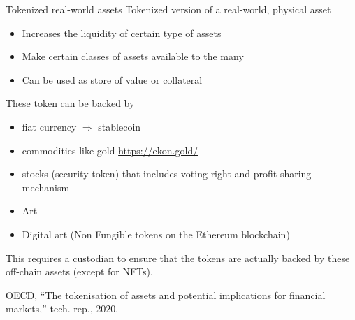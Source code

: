 \documentclass{beamer}
\begin{document}
\begin{frame}{Tokenized real-world assets}
\scriptsize
Tokenized version of a real-world, physical asset
\begin{itemize}
  \item Increases the liquidity of certain type of assets
  \item Make certain classes of assets available to the many
  \item Can be used as store of value or collateral
\end{itemize}
These token can be backed by 
\begin{itemize}
  \item fiat currency $\Rightarrow$ stablecoin
  \item commodities like gold \url{https://ekon.gold/}
  \item stocks (security token) that includes voting right and profit sharing mechanism
  \item Art
  \item Digital art (Non Fungible tokens on the Ethereum blockchain)
\end{itemize}
\begin{tcolorbox}[enhanced,drop shadow, title=Central authority]
    This requires a custodian to ensure that the tokens are actually backed by these off-chain assets (except for NFTs).
\end{tcolorbox}

\scriptsize
\begin{thebibliography}{1}

OECD, ``The tokenisation of assets and potential implications for financial
  markets,'' tech. rep., 2020.

\end{thebibliography}
\end{frame}
\end{document}
